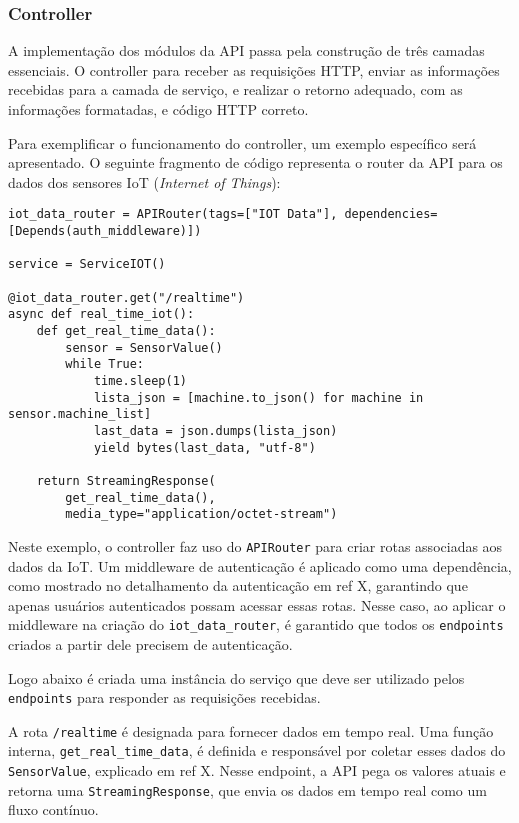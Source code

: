 \subsubsection{Controller}\label{subsubsec:controller}
A implementação dos módulos da API passa pela construção de três camadas essenciais. O controller para receber as requisições HTTP, enviar as informações recebidas para a camada de serviço, e realizar o retorno adequado, com as informações formatadas, e código HTTP correto.

Para exemplificar o funcionamento do controller, um exemplo específico será apresentado. O seguinte fragmento de código representa o router da API para os dados dos sensores IoT (\textit{Internet of Things}):

\begin{verbatim}
iot_data_router = APIRouter(tags=["IOT Data"], dependencies=[Depends(auth_middleware)])

service = ServiceIOT()

@iot_data_router.get("/realtime")
async def real_time_iot(): 
    def get_real_time_data():
        sensor = SensorValue()
        while True:
            time.sleep(1)
            lista_json = [machine.to_json() for machine in sensor.machine_list]
            last_data = json.dumps(lista_json)
            yield bytes(last_data, "utf-8")

    return StreamingResponse(
        get_real_time_data(),
        media_type="application/octet-stream")
\end{verbatim}

Neste exemplo, o controller faz uso do \texttt{APIRouter} para criar rotas associadas aos dados da IoT. Um middleware de autenticação é aplicado como uma dependência, como mostrado no detalhamento da autenticação em ref X, garantindo que apenas usuários autenticados possam acessar essas rotas. Nesse caso, ao aplicar o middleware na criação do \texttt{iot\_data\_router}, é garantido que todos os \texttt{endpoints} criados a partir dele precisem de autenticação.

Logo abaixo é criada uma instância do serviço que deve ser utilizado pelos \texttt{endpoints} para responder as requisições recebidas.

A rota \texttt{/realtime} é designada para fornecer dados em tempo real. Uma função interna, \texttt{get\_real\_time\_data}, é definida e responsável por coletar esses dados do \texttt{SensorValue}, explicado em ref X. Nesse endpoint, a API pega os valores atuais e retorna uma \texttt{StreamingResponse}, que envia os dados em tempo real como um fluxo contínuo.

